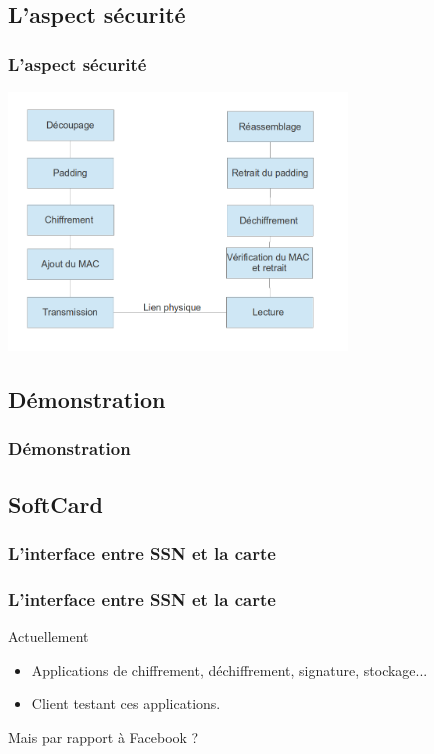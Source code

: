 \documentclass{beamer}
\begin{document}
\subsection{L'aspect sécurité}
\begin{frame}
    \frametitle{L'aspect sécurité}
    \includegraphics[width=9cm]{stack}
\end{frame}

\subsection{Démonstration}
\begin{frame}
    \frametitle{Démonstration}
    \begin{block}{}
    \end{block}
\end{frame}

\subsection{SoftCard}
\begin{frame}
\frametitle{L'interface entre SSN et la carte}
    \frametitle{L'interface entre SSN et la carte}
    \begin{block}{Actuellement}
        \begin{itemize}
            \item Applications de chiffrement, déchiffrement, signature, stockage...
            \item Client testant ces applications.
        \end{itemize}
    \end{block}

    Mais par rapport à Facebook ?
\end{frame}
\end{document}
